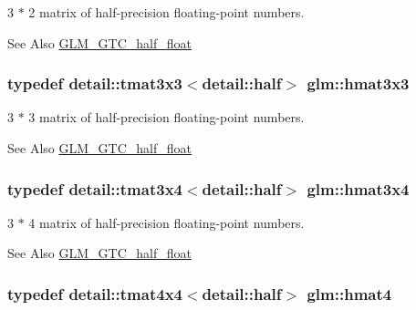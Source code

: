 3 $\ast$ 2 matrix of half-\/precision floating-\/point numbers. 

\begin{DoxySeeAlso}{See Also}
\hyperlink{group__gtc__half__float}{G\-L\-M\-\_\-\-G\-T\-C\-\_\-half\-\_\-float} 
\end{DoxySeeAlso}
\hypertarget{group__gtc__half__float_ga074b3f26b6be3af8ac817a2c4eba8434}{
\subsubsection[{hmat3x3}]{\setlength{\rightskip}{0pt plus 5cm}typedef detail\-::tmat3x3$<$detail\-::half$>$ {\bf glm\-::hmat3x3}}}\label{group__gtc__half__float_ga074b3f26b6be3af8ac817a2c4eba8434}


3 $\ast$ 3 matrix of half-\/precision floating-\/point numbers. 

\begin{DoxySeeAlso}{See Also}
\hyperlink{group__gtc__half__float}{G\-L\-M\-\_\-\-G\-T\-C\-\_\-half\-\_\-float} 
\end{DoxySeeAlso}
\hypertarget{group__gtc__half__float_gabde8c0dd3585490525f0d2b2da25e24a}{
\subsubsection[{hmat3x4}]{\setlength{\rightskip}{0pt plus 5cm}typedef detail\-::tmat3x4$<$detail\-::half$>$ {\bf glm\-::hmat3x4}}}\label{group__gtc__half__float_gabde8c0dd3585490525f0d2b2da25e24a}


3 $\ast$ 4 matrix of half-\/precision floating-\/point numbers. 

\begin{DoxySeeAlso}{See Also}
\hyperlink{group__gtc__half__float}{G\-L\-M\-\_\-\-G\-T\-C\-\_\-half\-\_\-float} 
\end{DoxySeeAlso}
\hypertarget{group__gtc__half__float_gaf5091515fa8c775f1e511d1e6790e968}{
\subsubsection[{hmat4}]{\setlength{\rightskip}{0pt plus 5cm}typedef detail\-::tmat4x4$<$detail\-::half$>$ {\bf glm\-::hmat4}}}\label{group__gtc__half__float_gaf5091515fa8c775f1e511d1e6790e968}


